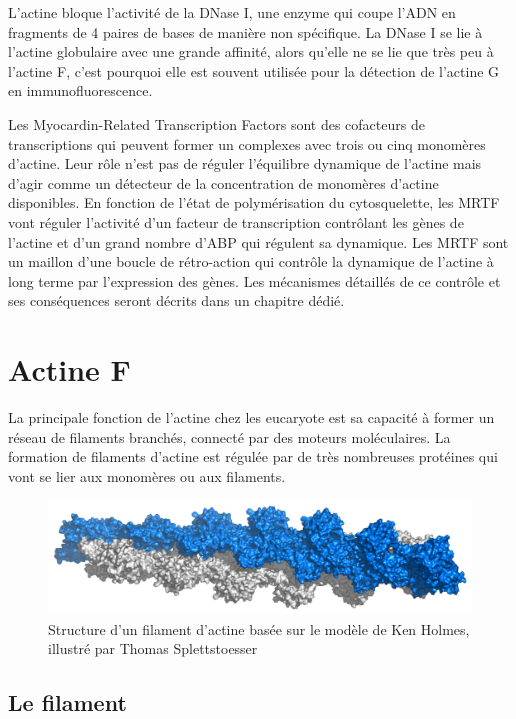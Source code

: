 L'actine bloque l'activité de la DNase I, une enzyme qui coupe l'ADN en fragments de 4 paires de bases de manière non spécifique. La DNase I se lie à l'actine globulaire avec une grande affinité, alors qu'elle ne se lie que très peu à l'actine F, c'est pourquoi elle est souvent utilisée pour la détection de l'actine G en immunofluorescence. 

Les Myocardin-Related Transcription Factors sont des cofacteurs de transcriptions qui peuvent former un complexes avec trois ou cinq monomères d'actine. Leur rôle n'est pas de réguler l'équilibre dynamique de l'actine mais d'agir comme un détecteur de la concentration de monomères d'actine disponibles. 
En fonction de l'état de polymérisation du cytosquelette, les MRTF vont réguler l'activité d'un facteur de transcription contrôlant les gènes de l'actine et d'un grand nombre d'ABP qui régulent sa dynamique. 
Les MRTF sont un maillon d'une boucle de rétro-action qui contrôle la dynamique de l'actine à long terme par l'expression des gènes. 
Les mécanismes détaillés de ce contrôle et ses conséquences seront décrits dans un chapitre dédié. 

\section{Actine F}

La principale fonction de l'actine chez les eucaryote est sa capacité à former un réseau de filaments branchés, connecté par des moteurs moléculaires. 
La formation de filaments d'actine est régulée par de très nombreuses protéines qui vont se lier aux monomères ou aux filaments. 

\begin{figure}
\includegraphics[scale=0.3]{Actin_filament_atomic_model.png}
\caption{Structure d'un filament d'actine basée sur le modèle de Ken Holmes, illustré par Thomas Splettstoesser}
\end{figure}

\subsection{Le filament}

